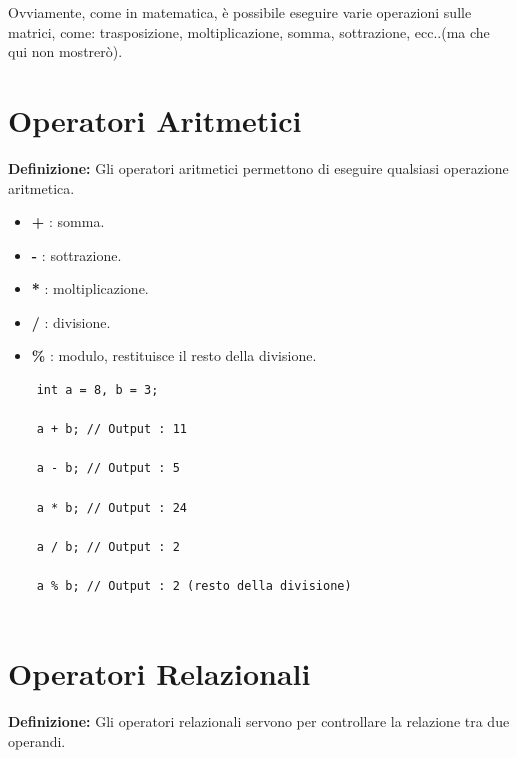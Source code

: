 \textsf{\small Ovviamente, come in matematica, è possibile eseguire varie operazioni sulle matrici, come: trasposizione, moltiplicazione, somma, sottrazione, ecc..(ma che qui non mostrerò).} \\ 


\section{Operatori Aritmetici}

\textsf{\small \textbf{Definizione: } Gli operatori aritmetici permettono di eseguire qualsiasi operazione aritmetica.} \\

\begin{itemize}
	\item \textsf{\small \textbf{+} : somma.}
	\item \textsf{\small \textbf{-} : sottrazione.}
	\item \textsf{\small \textbf{*} : moltiplicazione.}
	\item \textsf{\small \textbf{/} : divisione.}
	\item \textsf{\small \textbf{\%} : modulo, restituisce il resto della divisione.}
\end{itemize}

\begin{lstlisting}
	int a = 8, b = 3;
	
	a + b; // Output : 11
	
	a - b; // Output : 5
	
	a * b; // Output : 24
	
	a / b; // Output : 2
	
	a % b; // Output : 2 (resto della divisione)
	
\end{lstlisting}


\section{Operatori Relazionali}

\textsf{\small \textbf{Definizione: } Gli operatori relazionali servono per controllare la relazione tra due operandi. } \\

